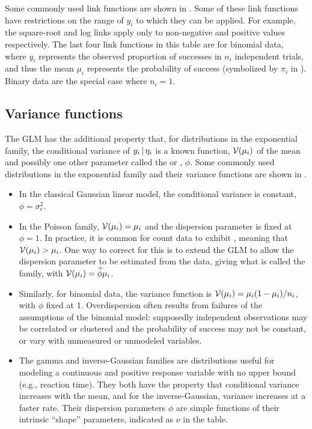 \documentclass[11pt]{book}\usepackage[]{graphicx}\usepackage[]{color}
\begin{document}


Some commonly used link functions are shown in .
Some of these link functions have restrictions on the range of $y_i$
to which they can be applied.  For example, the square-root and log links
apply only to non-negative and
positive values respectively.  
The last four link functions in this
table are for binomial data, where $y_i$ represents the observed proportion
of successes in $n_i$ independent trials, and thus the mean $\mu_i$
represents the probability of success (symbolized by $\pi_i$ in ).
Binary data are the special case where $n_i=1$.

\subsection{Variance functions}
The GLM has the additional property that, for distributions in the exponential family,
the conditional variance of $y_i \, | \, \eta_i$ is a known function, $\mathcal{V} (\mu_i)$
of the mean and possibly one other parameter called the  or
, $\phi$. Some commonly used distributions in the 
exponential family and their variance functions are shown in .



\begin{itemize}
\item In the classical Gaussian linear model, the conditional variance is constant,
$\phi = \sigma^2_\epsilon$. 

\item In the Poisson family, $\mathcal{V} (\mu_i) = \mu_i$
and the dispersion parameter is fixed at $\phi = 1$.
In practice, it is common for count data to exhibit ,
meaning that $\mathcal{V} (\mu_i) > \mu_i$.  One way to correct for this is to extend
the GLM to allow the dispersion parameter to be estimated from the data,
giving what is called the  family, with $\mathcal{V} (\mu_i) = \widehat{\phi} \mu_i$.

\item Similarly, for binomial data, the variance function is $\mathcal{V} (\mu_i) = \mu_i (1-\mu_i) / n_i$,
with $\phi$ fixed at 1.
Overdispersion often results from failures of the assumptions of the binomial model:
supposedly independent observations may be correlated or clustered and the probability
of success may not be constant, or vary with unmeasured or unmodeled variables.

\item The gamma and inverse-Gaussian families are distributions useful for modeling a continuous
and positive response variable with no upper bound (e.g., reaction time). They both have the 
property that conditional variance increases with the mean, and for the inverse-Gaussian,
variance increases at a faster rate.  Their dispersion parameters $\phi$ are simple functions
of their intrinsic ``shape'' parameters, indicated as $\nu$ in the table.  

\end{itemize}
\end{document}

